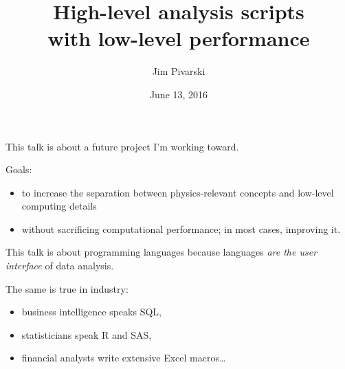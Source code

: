 \documentclass{beamer}
\title[2016-06-13-high-level-low-level]{High-level analysis scripts \\ with low-level performance}
\author{Jim Pivarski}
\institute{Princeton University -- DIANA}
\date{June 13, 2016}
\begin{document}

\begin{frame}
  \titlepage
\end{frame}



\begin{frame}{}
\vfill
This talk is about a future project I'm working toward.

\vfill
\begin{block}{Goals:}
\begin{itemize}
\item to increase the separation between physics-relevant concepts and low-level computing details
\item without sacrificing computational performance; in most cases, improving it.
\end{itemize}
\end{block}
\end{frame}

\begin{frame}{}
\vfill
This talk is about programming languages because languages {\it are the user interface} of data analysis.

\vfill
The same is true in industry:
\begin{itemize}
\item business intelligence speaks SQL,
\item statisticians speak R and SAS,
\item financial analysts write extensive Excel macros\ldots
\end{itemize}
\end{frame}
\end{document}
